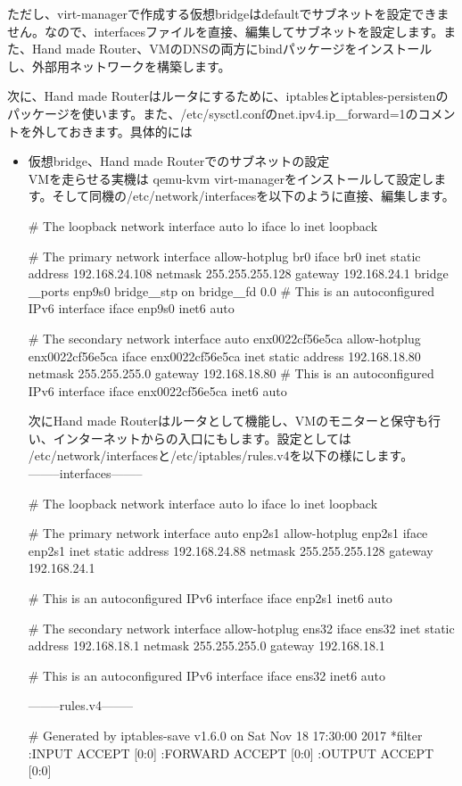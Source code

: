 \documentclass[mingoth,a4paper]{jsarticle}
\begin{document}
ただし、virt-managerで作成する仮想bridgeはdefaultでサブネットを設定できません。なので、interfacesファイルを直接、編集してサブネットを設定します。また、Hand made Router、VMのDNSの両方にbindパッケージをインストールし、外部用ネットワークを構築します。

次に、Hand made Routerはルータにするために、iptablesとiptables-persistenのパッケージを使います。また、/etc/sysctl.confのnet.ipv4.ip＿forward=1のコメントを外しておきます。具体的には

\begin{itemize}
\item 仮想bridge、Hand made Routerでのサブネットの設定\\
VMを走らせる実機は qemu-kvm virt-managerをインストールして設定します。そして同機の/etc/network/interfacesを以下のように直接、編集します。
\begin{commandline}
# The loopback network interface
auto lo
iface lo inet loopback

# The primary network interface
allow-hotplug br0
iface br0 inet static
   address 192.168.24.108
   netmask 255.255.255.128
   gateway 192.168.24.1
   bridge＿ports enp9s0
   bridge＿stp on
   bridge＿fd 0.0
# This is an autoconfigured IPv6 interface
iface enp9s0 inet6 auto

# The secondary network interface
auto enx0022cf56e5ca
allow-hotplug enx0022cf56e5ca
iface enx0022cf56e5ca inet static
address 192.168.18.80
netmask 255.255.255.0
gateway 192.168.18.80
# This is an autoconfigured IPv6 interface
iface enx0022cf56e5ca inet6 auto
\end{commandline}
次にHand made Routerはルータとして機能し、VMのモニターと保守も行い、インターネットからの入口にもします。設定としては /etc/network/interfacesと/etc/iptables/rules.v4を以下の様にします。\\
--------interfaces--------
\begin{commandline}
# The loopback network interface
auto lo
iface lo inet loopback

# The primary network interface
auto enp2s1
allow-hotplug enp2s1
iface enp2s1 inet static
address 192.168.24.88
netmask 255.255.255.128
gateway 192.168.24.1

# This is an autoconfigured IPv6 interface
iface enp2s1 inet6 auto

# The secondary network interface
allow-hotplug ens32
iface ens32 inet static
address 192.168.18.1
netmask 255.255.255.0
gateway 192.168.18.1

# This is an autoconfigured IPv6 interface
iface ens32 inet6 auto
\end{commandline}
\clearpage
--------rules.v4--------
\begin{commandline}
# Generated by iptables-save v1.6.0 on Sat Nov 18 17:30:00 2017
*filter
:INPUT ACCEPT [0:0]
:FORWARD ACCEPT [0:0]
:OUTPUT ACCEPT [0:0]


\end{commandline}
\end{itemize}
\end{document}
